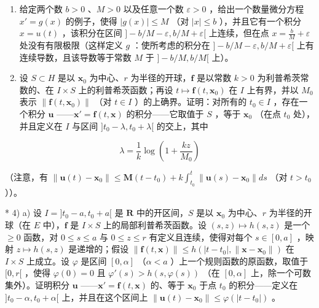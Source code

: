 \begin{enumerate}
\def\labelenumi{\arabic{enumi})}
\setcounter{enumi}{1}
\item
  给定两个数 \(b > 0\) 、\(M > 0\) 以及任意一个数 \(\varepsilon > 0\) ，给出一个数量微分方程 \(x' = g(x)\) 的例子，使得 \(|g(x)| \leqslant M\) （对 \(|x| \leqslant b\) ），并且它有一个积分 \(x = u(t)\) ，该积分在区间 \(] - b/M - \varepsilon, b/M + \varepsilon[\) 上连续，但在点 \(x = \frac{b}{M} + \varepsilon\) 处没有有限极限（这样定义 \(g\) ：使所考虑的积分在 \(] - b/M - \varepsilon, b/M + \varepsilon[\) 上有连续导数，且该导数等于常数 \(M\) 于 \(] - b/M, b/M[\) 上）。
\item
  设 \(S \subset H\) 是以 \(\mathbf{x}_0\) 为中心、\(r\) 为半径的开球，\(\mathbf{f}\) 是以常数 \(k > 0\) 为利普希茨常数的、在 \(I \times S\) 上的利普希茨函数；再设 \(t \mapsto \mathbf{f}(t, \mathbf{x}_0)\) 在 \(I\) 上有界，并以 \(M_0\) 表示 \(\| \mathbf{f}(t, \mathbf{x}_0) \|\) （对 \(t \in I\) ）的上确界。证明：对所有的 \(t_0 \in I\) ，存在一个积分 \(\mathbf{u}\) ——\(\mathbf{x}' = \mathbf{f}(t, \mathbf{x})\) 的积分——它取值于 \(S\) ，等于 \(\mathbf{x}_0\) （在点 \(t_0\) 处），并且定义在 \(I\) 与区间 \(]t_0 - \lambda, t_0 + \lambda[\) 的交上，其中
\end{enumerate}

\[
\lambda = \frac {1}{k} \log \left(1 + \frac {k z}{M _ {0}}\right)
\]

（注意，有 \(\| \mathbf{u}(t) - \mathbf{x}_0\| \leqslant \mathbf{M}(t - t_0) + k\int_{t_0}^t\| \mathbf{u}(s) - \mathbf{x}_0\| ds\) （对 \(t > t_0\) ））。

* 4) a) 设 \(I = ]t_0 - a, t_0 + a[\) 是 \(\mathbf{R}\) 中的开区间，\(S\) 是以 \(\mathbf{x}_0\) 为中心、\(r\) 为半径的开球（在 \(E\) 中），\(\mathbf{f}\) 是 \(I \times S\) 上的局部利普希茨函数。设 \((s, z) \mapsto h(s, z)\) 是一个 \(\geqslant 0\) 函数，对 \(0 \leqslant s \leqslant a\) 与 \(0 \leqslant z \leqslant r\) 有定义且连续，使得对每个 \(s \in [0, a]\) ，映射 \(z \mapsto h(s, z)\) 是递增的；假设 \(\| \mathbf{f}(t, \mathbf{x}) \| \leqslant h(|t - t_0|, \| \mathbf{x} - \mathbf{x}_0 \|)\) 在 \(I \times S\) 上成立。设 \(\varphi\) 是区间 \([0, \alpha]\) （\(\alpha < a\) ）上一个规则函数的原函数，取值于 \([0, r[\) ，使得 \(\varphi(0) = 0\) 且 \(\varphi'(s) > h(s, \varphi(s))\) （在 \([0, \alpha]\) 上，除一个可数集外）。证明积分 \(\mathbf{u}\) ——\(\mathbf{x}' = \mathbf{f}(t, \mathbf{x})\) 的、等于 \(\mathbf{x}_0\) 于点 \(t_0\) 的积分——定义在 \(]t_0 - \alpha, t_0 + \alpha[\) 上，并且在这个区间上 \(\| \mathbf{u}(t) - \mathbf{x}_0 \| \leqslant \varphi(|t - t_0|)\) 。

